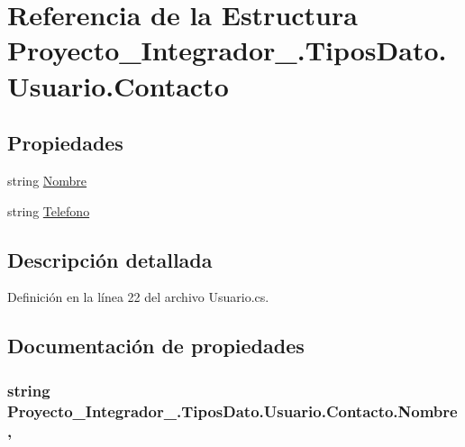\hypertarget{struct_proyecto___integrador__3_1_1_tipos_dato_1_1_usuario_1_1_contacto}{\section{Referencia de la Estructura Proyecto\-\_\-\-Integrador\-\_.\-Tipos\-Dato.\-Usuario.\-Contacto}
\label{struct_proyecto___integrador__3_1_1_tipos_dato_1_1_usuario_1_1_contacto}
}
\subsection*{Propiedades}
\begin{DoxyCompactItemize}
\item 
string \hyperlink{struct_proyecto___integrador__3_1_1_tipos_dato_1_1_usuario_1_1_contacto_a3e93d9ea0c8ee3ff1636026f11aa70f2}{Nombre}
\item 
string \hyperlink{struct_proyecto___integrador__3_1_1_tipos_dato_1_1_usuario_1_1_contacto_ab7f1bc9965c69b9f9c44f5f021fdaec9}{Telefono}
\end{DoxyCompactItemize}


\subsection{Descripción detallada}


Definición en la línea 22 del archivo Usuario.\-cs.



\subsection{Documentación de propiedades}
\hypertarget{struct_proyecto___integrador__3_1_1_tipos_dato_1_1_usuario_1_1_contacto_a3e93d9ea0c8ee3ff1636026f11aa70f2}{
\subsubsection[{Nombre}]{\setlength{\rightskip}{0pt plus 5cm}string Proyecto\-\_\-\-Integrador\-\_.\-Tipos\-Dato.\-Usuario.\-Contacto.\-Nombre\hspace{0.3cm}{\ttfamily [get]}, {\ttfamily [set]}}}\label{struct_proyecto___integrador__3_1_1_tipos_dato_1_1_usuario_1_1_contacto_a3e93d9ea0c8ee3ff1636026f11aa70f2}


